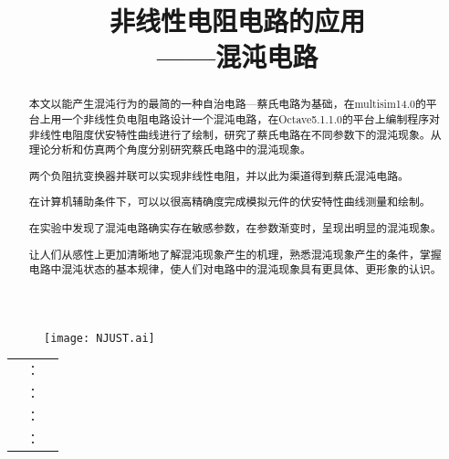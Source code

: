 \documentclass{article}
\title{\textbf{非线性电阻电路的应用\\——混沌电路}}
\author{}
\date{}
\begin{document}
\begin{titlepage}
	\centering
	\begin{figure}[htbp]
		\centering
		\texttt{[image: NJUST.ai]}
		\label{fig:NJUST}
	\end{figure}

	\vspace{20mm}
	\textbf{}

	\vspace{5mm}
	\textbf{}

	\vspace{20mm}
	\begin{table}[htbp]
		\centering
		\begin{longtabu}to.8
			&：&\underline{}\\
			&：&\underline{}\\
			&：&\underline{}\\
			&：&\underline{}
		\end{longtabu}
	\end{table}

	\vspace{10mm}
	\kaishu{\today}
\end{titlepage}

\maketitle

\begin{abstract}
	本文以能产生混沌行为的最简的一种自治电路—蔡氏电路为基础，在multisim14.0的平台上用一个非线性负电阻电路设计一个混沌电路，在Octave5.1.1.0的平台上编制程序对非线性电阻度伏安特性曲线进行了绘制，研究了蔡氏电路在不同参数下的混沌现象。从理论分析和仿真两个角度分别研究蔡氏电路中的混沌现象。

	两个负阻抗变换器并联可以实现非线性电阻，并以此为渠道得到蔡氏混沌电路。

	在计算机辅助条件下，可以以很高精确度完成模拟元件的伏安特性曲线测量和绘制。

	在实验中发现了混沌电路确实存在敏感参数，在参数渐变时，呈现出明显的混沌现象。

	让人们从感性上更加清晰地了解混沌现象产生的机理，熟悉混沌现象产生的条件，掌握电路中混沌状态的基本规律，使人们对电路中的混沌现象具有更具体、更形象的认识。
\end{abstract}
\end{document}
